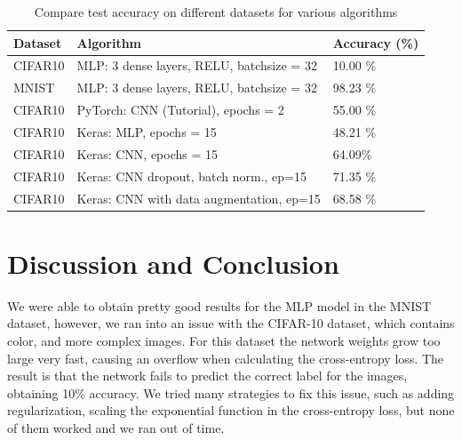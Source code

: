 \documentclass[conference]{IEEEtran}
\begin{document}
\begin{table}[H]
\caption{Compare test accuracy on different datasets for various algorithms}
\label{table:summaryAlgorithm}
\begin{center}
\begin{adjustbox}{max width=0.99\textwidth}
\begin{tabular}{|l|l|l|}
\hline
   Dataset       & Algorithm         & Accuracy (\%)   \\
  \hline
 CIFAR10      & MLP: 3 dense layers, RELU, batchsize = 32 &   10.00 \%                 \\
   \hline

 MNIST       & MLP: 3 dense layers, RELU, batchsize = 32 &   98.23 \%                 \\
   \hline

  CIFAR10      & PyTorch: CNN (Tutorial), epochs = 2     &   55.00 \%                 \\
    \hline

   CIFAR10      & Keras: MLP, epochs = 15 &   48.21 \%                 \\
     \hline

    CIFAR10      & Keras: CNN, epochs = 15 &    64.09\%                 \\
      \hline

     CIFAR10      & Keras: CNN dropout, batch norm., ep=15 &   71.35 \%      
     \\
       \hline

 CIFAR10      & Keras: CNN with data augmentation, ep=15     &   68.58 \%                 \\
   \hline

\hline
\end{tabular}
\end{adjustbox}
\end{center}
\end{table}

\section{Discussion and Conclusion}
\label{section:discussion}

We were able to obtain pretty good results for the MLP model in the MNIST dataset, however, we ran into an issue with the CIFAR-10 dataset, which contains color, and more complex images. For this dataset the network weights grow too large very fast, causing an overflow when calculating the cross-entropy loss. The result is that the network fails to predict the correct label for the images, obtaining 10\% accuracy. We tried many strategies to fix this issue, such as adding regularization, scaling the exponential function in the cross-entropy loss, but none of them worked and we ran out of time.
\end{document}
